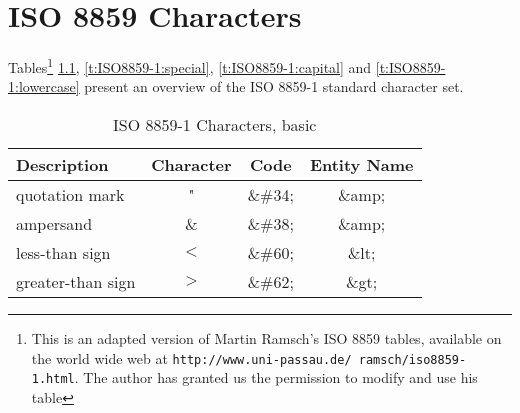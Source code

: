 %
%


\chapter{ISO 8859 Characters}
\label{s:ISO8859}

Tables\footnote{This is an adapted version of Martin Ramsch's ISO
  8859 tables, available on the world wide web at
  \texttt{http://www.uni-passau.de/~ramsch/iso8859-1.html}. The
  author has granted us the permission to modify and use his
  table} \ref{t:ISO8859-1:basic}, \ref{t:ISO8859-1:special},
\ref{t:ISO8859-1:capital} and \ref{t:ISO8859-1:lowercase} present
an overview of the ISO 8859-1 standard character set.



\begin{table}[htbp]
  \begin{center}
    \leavevmode

    \begin{tabular}{lc>{\ttfamily}c>{\ttfamily}c}
      \textbf{Description} &
      \textbf{Character} &
      \textbf{Code} &
      \textbf{Entity Name} \\
      \hline
      quotation mark             & "   & \&\#34; & \&amp; \\
      ampersand                  & \&  & \&\#38; & \&amp; \\
      less-than sign             & $<$ & \&\#60; & \&lt; \\
      greater-than sign          & $>$ & \&\#62; & \&gt; \\
    \end{tabular}
    
    \caption{ISO 8859-1 Characters, basic}
    \label{t:ISO8859-1:basic}
  \end{center}
\end{table}

